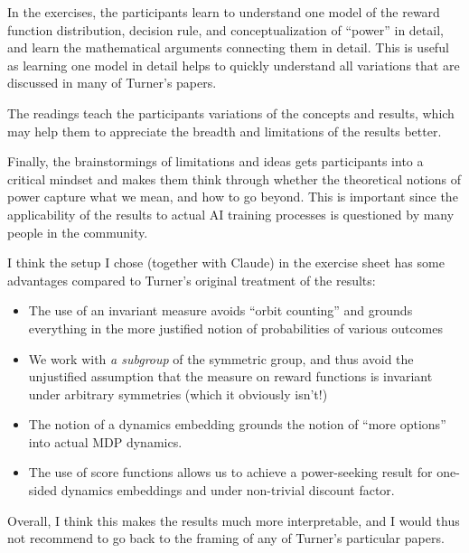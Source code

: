 \documentclass[11pt]{article}
\begin{document}
\begin{teachingnote}
In the exercises, the participants learn to understand one model of the reward
function distribution, decision rule, and conceptualization of ``power'' in
detail, and learn the mathematical arguments connecting them in detail. This is
useful as learning one model in detail helps to quickly understand all variations
that are discussed in many of Turner's papers.

The readings teach the participants variations of the concepts and results, which
may help them to appreciate the breadth and limitations of the results better.

Finally, the brainstormings of limitations and ideas gets participants into a
critical mindset and makes them think through whether the theoretical notions of
power capture what we mean, and how to go beyond. This is important since the
applicability of the results to actual AI training processes is questioned by
many people in the community.
\end{teachingnote}

\begin{teachingnote}
I think the setup I chose (together with Claude) in the exercise sheet has some
advantages compared to Turner's original treatment of the results:

\begin{itemize}
  \item The use of an invariant measure avoids ``orbit counting'' and grounds everything in the more justified notion of probabilities of various outcomes
  \item We work with \emph{a subgroup} of the symmetric group, and thus avoid the unjustified assumption that the measure on reward functions is invariant under arbitrary symmetries (which it obviously isn't!)
  \item The notion of a dynamics embedding grounds the notion of ``more options'' into actual MDP dynamics.
  \item The use of score functions allows us to achieve a power-seeking result for one-sided dynamics embeddings and under non-trivial discount factor.
\end{itemize}

Overall, I think this makes the results much more interpretable, and I would thus
not recommend to go back to the framing of any of Turner's particular papers.
\end{teachingnote}
\end{document}
